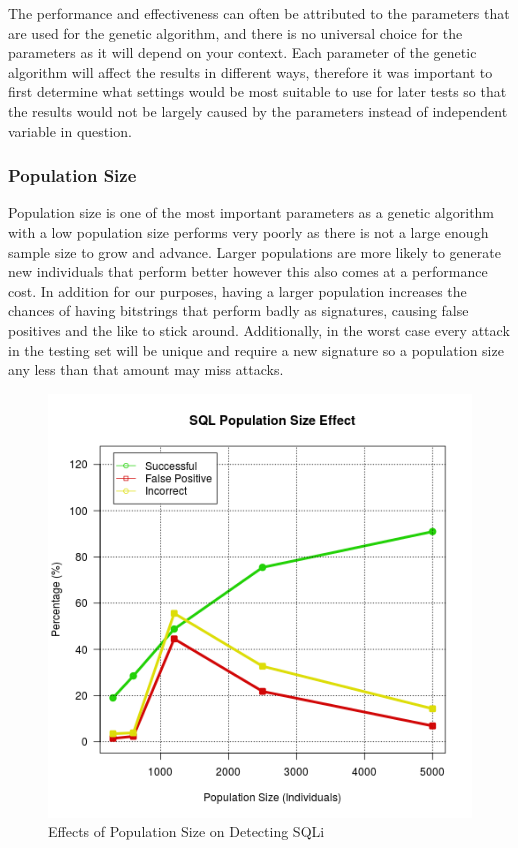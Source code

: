 The performance and effectiveness can often be attributed to the parameters that are used for the genetic algorithm, and there is no universal choice for the parameters as it will depend on your context.  Each parameter of the genetic algorithm will affect the results in different ways, therefore it was important to first determine what settings would be most suitable to use for later tests so that the results would not be largely caused by the parameters instead of independent variable in question.  

\subsubsection{Population Size}

Population size is one of the most important parameters as a genetic algorithm with a low population size performs very poorly as there is not a large enough sample size to grow and advance.  Larger populations are more likely to generate new individuals that perform better however this also comes at a performance cost. %
In addition for our purposes, having a larger population increases the chances of having bitstrings that perform badly as signatures, causing false positives and the like to stick around.  Additionally, in the worst case every attack in the testing set will be unique and require a new signature so a population size any less than that amount may miss attacks.

\begin{figure}
	\label{fig:resPopSize}
	\includegraphics[width=450px]{./assets/results/ga/pop/Results_SQL.png}
	\caption{Effects of Population Size on Detecting SQLi}
\end{figure}

